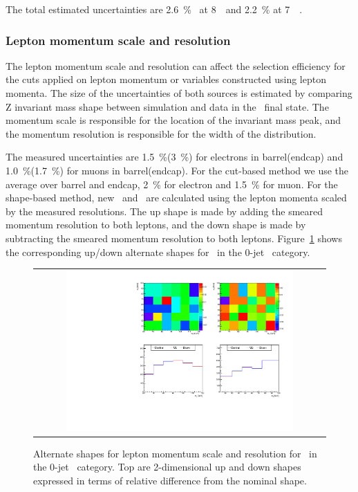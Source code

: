 The total estimated uncertainties are 2.6~\%~\cite{CMS-PAS-LUM-13-001} at 8~\TeV\ 
and 2.2~\% at 7~\TeV~\cite{Chatrchyan:2013oda}.  

\subsubsection{Lepton momentum scale and resolution}

The lepton momentum scale and resolution can affect the selection efficiency 
for the cuts applied on lepton momentum or variables constructed using 
lepton momenta. The size of the uncertainties of both sources is estimated 
by comparing Z invariant mass shape between simulation and data in the \SF\ 
final state. The momentum scale is responsible for the location of the 
invariant mass peak, and the momentum resolution is responsible for the width 
of the distribution. 

The measured uncertainties are 1.5~\%(3~\%) for electrons in barrel(endcap)  
and 1.0~\%(1.7~\%) for muons in barrel(endcap). For the cut-based method 
we use the average over barrel and endcap, 2~\% for electron and 1.5~\% for muon. 
For the shape-based method, new \mT\ and \mll\ are calculated using the 
lepton momenta scaled by the measured resolutions.
The up shape is made by adding the smeared momentum resolution to both leptons,
and the down shape is made by subtracting the smeared momentum resolution to both leptons.
Figure~\ref{fig:alter_lepres} shows the corresponding up/down alternate shapes 
for \qqww\ in the 0-jet \DF\ category. 
%
\begin{figure}[htp]
\centering
\begin{tabular}{c}
\includegraphics[width=0.8\textwidth]{figures/histo_qqWW_CMS_hww_MVALepResBounding_0j_zoom.pdf}
\end{tabular}
\caption{Alternate shapes for lepton momentum scale and resolution for \qqww\ in the 0-jet \DF\ category.
         Top are 2-dimensional up and down shapes expressed in terms of relative 
         difference from the nominal shape.}
\label{fig:alter_lepres}
\end{figure}


